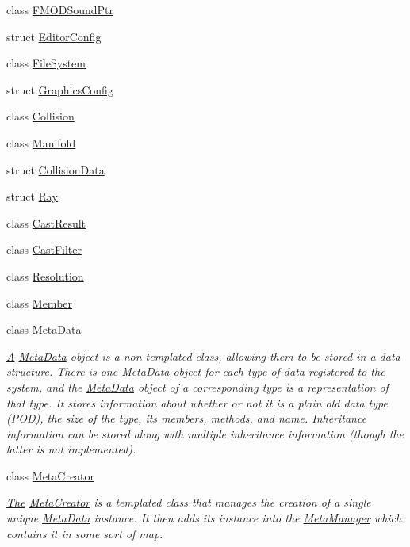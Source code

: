 \begin{DoxyCompactItemize}
\item 
class \hyperlink{classDCEngine_1_1FMODSoundPtr}{F\-M\-O\-D\-Sound\-Ptr}
\item 
struct \hyperlink{structDCEngine_1_1EditorConfig}{Editor\-Config}
\item 
class \hyperlink{classDCEngine_1_1FileSystem}{File\-System}
\item 
struct \hyperlink{structDCEngine_1_1GraphicsConfig}{Graphics\-Config}
\item 
class \hyperlink{classDCEngine_1_1Collision}{Collision}
\item 
class \hyperlink{classDCEngine_1_1Manifold}{Manifold}
\item 
struct \hyperlink{structDCEngine_1_1CollisionData}{Collision\-Data}
\item 
struct \hyperlink{structDCEngine_1_1Ray}{Ray}
\item 
class \hyperlink{structDCEngine_1_1CastResult}{Cast\-Result}
\item 
class \hyperlink{structDCEngine_1_1CastFilter}{Cast\-Filter}
\item 
class \hyperlink{classDCEngine_1_1Resolution}{Resolution}
\item 
class \hyperlink{classDCEngine_1_1Member}{Member}
\item 
class \hyperlink{classDCEngine_1_1MetaData}{Meta\-Data}
\begin{DoxyCompactList}\small\item\em \hyperlink{classA}{A} \hyperlink{classDCEngine_1_1MetaData}{Meta\-Data} object is a non-\/templated class, allowing them to be stored in a data structure. There is one \hyperlink{classDCEngine_1_1MetaData}{Meta\-Data} object for each type of data registered to the system, and the \hyperlink{classDCEngine_1_1MetaData}{Meta\-Data} object of a corresponding type is a representation of that type. It stores information about whether or not it is a plain old data type (P\-O\-D), the size of the type, its members, methods, and name. Inheritance information can be stored along with multiple inheritance information (though the latter is not implemented). \end{DoxyCompactList}\item 
class \hyperlink{classDCEngine_1_1MetaCreator}{Meta\-Creator}
\begin{DoxyCompactList}\small\item\em \hyperlink{classThe}{The} \hyperlink{classDCEngine_1_1MetaCreator}{Meta\-Creator} is a templated class that manages the creation of a single unique \hyperlink{classDCEngine_1_1MetaData}{Meta\-Data} instance. It then adds its instance into the \hyperlink{classDCEngine_1_1MetaManager}{Meta\-Manager} which contains it in some sort of map. \end{DoxyCompactList}\item 

\end{DoxyCompactItemize}
